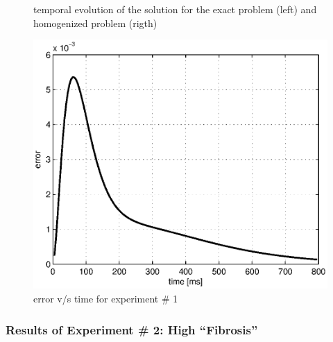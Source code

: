 \begin{figure}[H]
\centering
{} 
\caption{temporal evolution of the solution for the exact problem (left) and homogenized problem (rigth)}\label{fig:verification-r2ex1}
\end{figure}

\begin{figure}[H]
\centering
\includegraphics[height = 6 cm]{fig/theorem_verification_r2_exp1_error}
\caption{error v/s time for experiment \# 1} \label{fig:error_diff_r2}
\end{figure}

\newpage 
\subsubsection*{Results of Experiment \# 2: High ``Fibrosis''}

